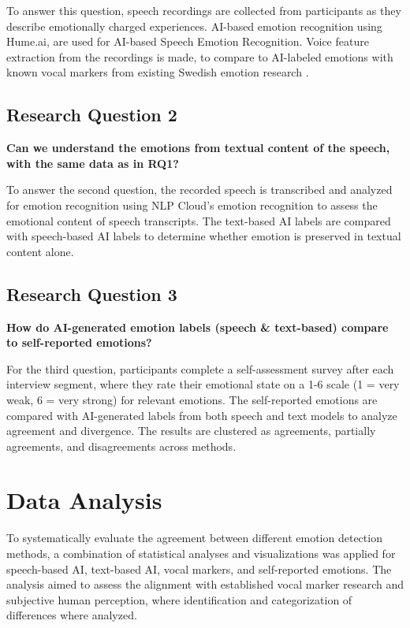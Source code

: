 To answer this question, speech recordings are collected from participants as they describe emotionally charged experiences. AI-based emotion recognition using Hume.ai, are used for AI-based Speech Emotion Recognition. Voice feature extraction from the recordings is made, to compare to AI-labeled emotions with known vocal markers from existing Swedish emotion research \autocite{Ekberg2023}. 

\subsection{Research Question 2}
\textbf{Can we understand the emotions from textual content of the speech, with the same data as in RQ1? }

To answer the second question, the recorded speech is transcribed and analyzed for emotion recognition using NLP Cloud’s emotion recognition to assess the emotional content of speech transcripts. The text-based AI labels are compared with speech-based AI labels to determine whether emotion is preserved in textual content alone. 

\subsection{Research Question 3}
\textbf{How do AI-generated emotion labels (speech \& text-based) compare to self-reported emotions? }

For the third question, participants complete a self-assessment survey after each interview segment, where they rate their emotional state on a 1-6 scale (1 = very weak, 6 = very strong) for relevant emotions. The self-reported emotions are compared with AI-generated labels from both speech and text models to analyze agreement and divergence. The results are clustered as agreements, partially agreements, and disagreements across methods. 


\section{Data Analysis}

To systematically evaluate the agreement between different emotion detection methods, a combination of statistical analyses and visualizations was applied for speech-based AI, text-based AI, vocal markers, and self-reported emotions. 
The analysis aimed to assess the alignment with established vocal marker research and subjective human perception, where identification and categorization of differences where analyzed. 

